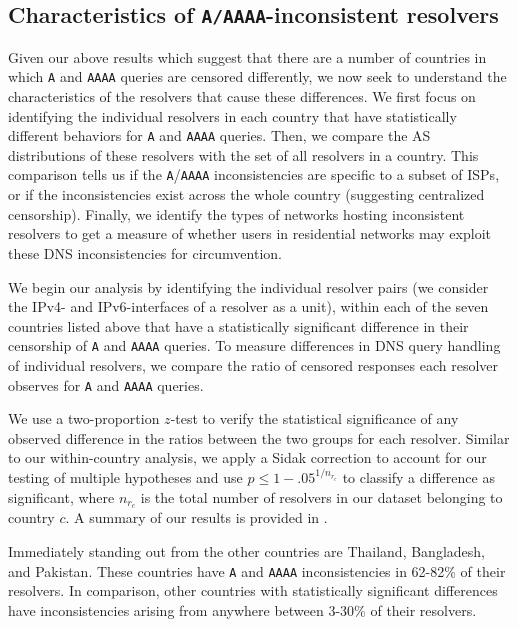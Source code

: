 \subsection{Characteristics of {\tt A/AAAA}-inconsistent resolvers}
\label{sec:resources:resolvers}
Given our above results which suggest that there are a number of countries in
which {\tt A} and {\tt AAAA} queries are censored differently, we now seek to
understand the characteristics of the resolvers that cause these differences.
%
We first focus on identifying the individual resolvers in each country that
have statistically different behaviors for {\tt A} and {\tt AAAA} queries.
Then, we compare the AS distributions of these resolvers with the set of all
resolvers in a country. This comparison tells us if the {\tt A}/{\tt AAAA}
inconsistencies are specific to a subset of ISPs, or if the inconsistencies
exist across the whole country (suggesting centralized censorship).
Finally, we identify the
types of networks hosting inconsistent resolvers to get a measure of whether
users in residential networks may exploit these DNS inconsistencies for
circumvention.

%
We begin our analysis by identifying the individual resolver pairs (\ie we
consider the IPv4- and IPv6-interfaces of a resolver as a unit), within each
of the seven countries listed above that have a statistically significant
difference in their censorship of {\tt A} and {\tt AAAA} queries.
%
To measure differences in DNS query handling of individual resolvers, we
compare the ratio of censored responses each resolver observes for {\tt A} and
{\tt AAAA} queries.

%
We use a two-proportion $z$-test to verify the statistical significance of any
observed difference in the ratios between the two groups for each resolver.
Similar to our within-country analysis, we apply a Sidak correction to account
for our testing of multiple hypotheses and use $p \leq 1-{.05}^{1/n_{r_c}}$ to
classify a difference as significant, where $n_{r_c}$ is the total number of
resolvers in our dataset belonging to country $c$.
%
A summary of our results is provided in . 

%
Immediately standing out from the other countries are Thailand, Bangladesh, and
Pakistan. These countries have {\tt A} and {\tt AAAA} inconsistencies in
62-82\% of their resolvers. In comparison, other countries with
statistically significant differences have inconsistencies arising from
anywhere between 3-30\% of their resolvers.
%


